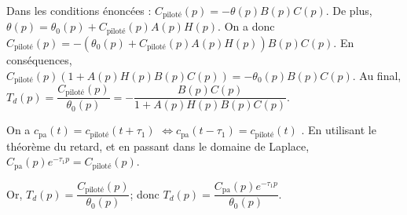 \ifprof
\begin{corrige}
Dans les conditions énoncées : $C_{\text{piloté}}(p)=-\theta(p) B(p) C(p)$. De plus,$\theta(p)=\theta_0(p)+C_{\text{piloté}}(p) A(p) H(p)$. 
On a donc $C_{\text{piloté}}(p)=-\left( \theta_0(p)+C_{\text{piloté}}(p) A(p) H(p) \right) B(p) C(p)$.
En conséquences, $C_{\text{piloté}}(p)\left( 1+ A(p) H(p) B(p) C(p) \right)=- \theta_0(p) B(p) C(p)$.
Au final, $T_d(p)=\dfrac{C_{\text{piloté}}(p)}{\theta_0(p)} = -\dfrac{ B(p) C(p)}{ 1+ A(p) H(p) B(p) C(p)}$.


 On a $c_{\text{pa}}(t)=c_{\text{piloté}}(t+\tau_1)$ $\Leftrightarrow c_{\text{pa}}(t-\tau_1)=c_{\text{piloté}}(t) $ . En utilisant le théorème du retard, et en passant dans le domaine de Laplace, 
  $C_{\text{pa}}(p)e^{-\tau_1 p} =C_{\text{piloté}}(p)$. 
  
Or, $T_d(p)=\dfrac{C_{\text{piloté}}(p)}{\theta_0(p)}$; donc $T_d(p)=\dfrac{C_{\text{pa}}(p)e^{-\tau_1 p}}{\theta_0(p)}$.


\end{corrige}
\else
\fi

